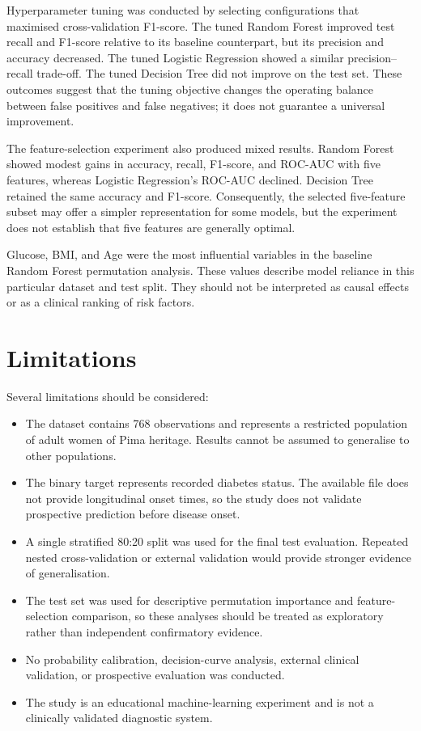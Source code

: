 \documentclass[12pt,a4paper]{article}
\begin{document}
Hyperparameter tuning was conducted by selecting configurations that maximised cross-validation F1-score. The tuned Random Forest improved test recall and F1-score relative to its baseline counterpart, but its precision and accuracy decreased. The tuned Logistic Regression showed a similar precision--recall trade-off. The tuned Decision Tree did not improve on the test set. These outcomes suggest that the tuning objective changes the operating balance between false positives and false negatives; it does not guarantee a universal improvement.

The feature-selection experiment also produced mixed results. Random Forest showed modest gains in accuracy, recall, F1-score, and ROC-AUC with five features, whereas Logistic Regression's ROC-AUC declined. Decision Tree retained the same accuracy and F1-score. Consequently, the selected five-feature subset may offer a simpler representation for some models, but the experiment does not establish that five features are generally optimal.

Glucose, BMI, and Age were the most influential variables in the baseline Random Forest permutation analysis. These values describe model reliance in this particular dataset and test split. They should not be interpreted as causal effects or as a clinical ranking of risk factors.

\clearpage
\section{Limitations}
Several limitations should be considered:
\begin{itemize}
    \item The dataset contains 768 observations and represents a restricted population of adult women of Pima heritage. Results cannot be assumed to generalise to other populations.
    \item The binary target represents recorded diabetes status. The available file does not provide longitudinal onset times, so the study does not validate prospective prediction before disease onset.
    \item A single stratified 80:20 split was used for the final test evaluation. Repeated nested cross-validation or external validation would provide stronger evidence of generalisation.
    \item The test set was used for descriptive permutation importance and feature-selection comparison, so these analyses should be treated as exploratory rather than independent confirmatory evidence.
    \item No probability calibration, decision-curve analysis, external clinical validation, or prospective evaluation was conducted.
    \item The study is an educational machine-learning experiment and is not a clinically validated diagnostic system.
\end{itemize}
\end{document}
